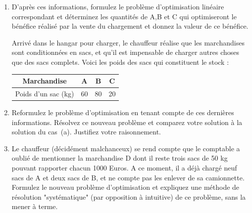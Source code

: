 \begin{enumerate}
    \begin{enumerate}
      \item D'après ces informations, formulez le problème d'optimisation
        linéaire correspondant et déterminez les quantités de A,B et C qui
        optimiseront le bénéfice réalisé par la vente du chargement et
        donnez la valeur de ce bénéfice.

        \vspace{6pt} Arrivé dans le hangar pour charger, le chauffeur
        réalise que les marchandises sont conditionnées en sacs, et qu'il
        est impensable de charger autres choses que des sacs complets.
        Voici les poids des sacs qui constituent le stock :
        \begin{center}
          \begin{tabular}{|c|c|c|c|}
            \hline %
            Marchandise & A & B & C\\
            \hline
            Poids d'un sac (kg) & 60 & 80 & 20 \\
            \hline
          \end{tabular}
        \end{center}

      \item Reformulez le problème d'optimisation en tenant compte de ces
        dernières informations. Résolvez ce nouveau problème et comparez
        votre solution à la solution du cas~(a). Justifiez votre
        raisonnement.

      \item Le chauffeur (décidément malchanceux) se rend compte que le
        comptable a oublié de mentionner la marchandise D dont il reste
        trois sacs de 50 kg pouvant rapporter chacun 1000 Euros. A ce
        moment, il a déjà chargé neuf sacs de A et deux sacs de B, et ne
        compte pas les enlever de sa camionnette. Formulez le nouveau
        problème d'optimisation et expliquez une méthode de résolution
        "systématique" (par opposition à intuitive) de ce problème, sans la
        mener à terme.
    \end{enumerate}



\end{enumerate}









\newpage





